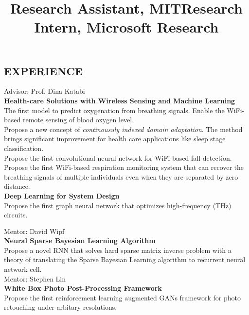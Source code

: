 \documentclass[margin]{res}
\newcommand{\Bullet}[1]{{\raisebox{0.25ex}{\tiny$\bullet$\ }}{#1}\\}
\begin{document}
\begin{resume}
\section{EXPERIENCE}
\title{\textbf{Research Assistant, MIT}}
\begin{position}
    Advisor: Prof. Dina Katabi \\
    \textbf{Health-care Solutions with Wireless Sensing and Machine Learning} \\
    \Bullet{The first model to predict oxygenation from breathing signals. Enable the WiFi-based remote sensing of blood oxygen level.}
    \Bullet{Propose a new concept of \emph{continousuly indexed domain adaptation}. The method brings significant improvement for health care applications like sleep stage classification.}
    \Bullet{Propose the first convolutional neural network for WiFi-based fall detection.}
    \Bullet{Propose the first WiFi-based respiration monitoring system that can recover the breathing signals
of multiple individuals even when they are separated by zero distance.}
    \textbf{Deep Learning for System Design}  \\
    \Bullet{Propose the first graph neural network that optimizes high-frequency (THz) circuits.}
\end{position}
\vspace{-5mm}

\title{\textbf{Research Intern, Microsoft Research}}
\begin{position}
    Mentor: David Wipf \\
    \textbf{Neural Sparse Bayesian Learning Algorithm} \\
    \Bullet{Propose a novel RNN that solves hard sparse matrix inverse problem with a theory of translating the Sparse Bayesian Learning algorithm to recurrent neural network cell.}

    \vspace{-7mm}
    Mentor: Stephen Lin \\
    \textbf{White Box Photo Post-Processing Framework} \\
    \Bullet{Propose the first reinforcement learning augmented GANs framework for photo retouching under arbitary resolutions. }
\end{position}
\vspace{-5mm}


\end{resume}
\end{document}
